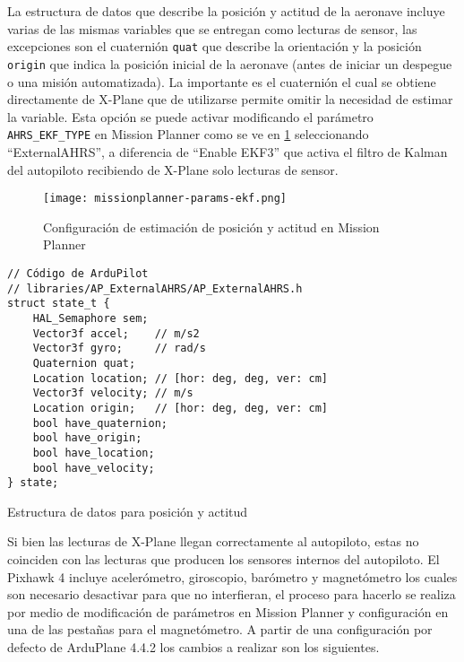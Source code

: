La estructura de datos que describe la posición y actitud de la aeronave incluye varias de las mismas variables que se entregan como lecturas de sensor, las excepciones son el cuaternión \texttt{quat} que describe la orientación y la posición \texttt{origin} que indica la posición inicial de la aeronave (antes de iniciar un despegue o una misión automatizada). La importante es el cuaternión el cual se obtiene directamente de X-Plane que de utilizarse permite omitir la necesidad de estimar la variable. Esta opción se puede activar modificando el parámetro \texttt{AHRS\_EKF\_TYPE} en Mission Planner como se ve en \cref{fig:missionplanner-params-ekf} seleccionando ``ExternalAHRS'', a diferencia de ``Enable EKF3'' que activa el filtro de Kalman del autopiloto recibiendo de X-Plane solo lecturas de sensor.

\begin{figure}[h]
    \centering
    \texttt{[image: missionplanner-params-ekf.png]}
    \caption{Configuración de estimación de posición y actitud en Mission Planner}
    \label{fig:missionplanner-params-ekf}
\end{figure}

\begin{listing}[h]
    \begin{verbatim}
// Código de ArduPilot
// libraries/AP_ExternalAHRS/AP_ExternalAHRS.h
struct state_t {
    HAL_Semaphore sem;
    Vector3f accel;    // m/s2
    Vector3f gyro;     // rad/s
    Quaternion quat;
    Location location; // [hor: deg, deg, ver: cm]
    Vector3f velocity; // m/s  
    Location origin;   // [hor: deg, deg, ver: cm]
    bool have_quaternion;
    bool have_origin;
    bool have_location;
    bool have_velocity;
} state;
    \end{verbatim}
    \caption{Estructura de datos para posición y actitud}
    \label{lst:ap-structs-2}
\end{listing}

Si bien las lecturas de X-Plane llegan correctamente al autopiloto, estas no coinciden con las lecturas que producen los sensores internos del autopiloto. El Pixhawk 4 incluye acelerómetro, giroscopio, barómetro y magnetómetro los cuales son necesario desactivar para que no interfieran, el proceso para hacerlo se realiza por medio de modificación de parámetros en Mission Planner y configuración en una de las pestañas para el magnetómetro. A partir de una configuración por defecto de ArduPlane 4.4.2 los cambios a realizar son los siguientes.

